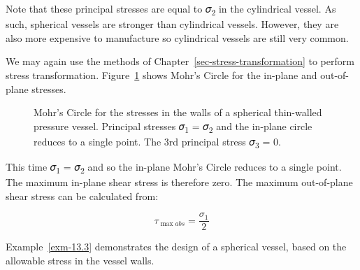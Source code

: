\documentclass[
  letterpaper,
  DIV=11,
  numbers=noendperiod]{scrreprt}
\theoremstyle{definition}
\theoremstyle{remark}
\begin{document}
Note that these principal stresses are equal to 𝜎\textsubscript{2} in
the cylindrical vessel. As such, spherical vessels are stronger than
cylindrical vessels. However, they are also more expensive to
manufacture so cylindrical vessels are still very common.

We may again use the methods of Chapter~\ref{sec-stress-transformation}
to perform stress transformation. Figure~\ref{fig-13.9} shows Mohr's
Circle for the in-plane and out-of-plane stresses.

\begin{figure}


\caption{\label{fig-13.9}Mohr's Circle for the stresses in the walls of
a spherical thin-walled pressure vessel. Principal stresses
𝜎\textsubscript{1} = 𝜎\textsubscript{2} and the in-plane circle reduces
to a single point. The 3rd principal stress 𝜎\textsubscript{3} = 0.}

\end{figure}%

This time 𝜎\textsubscript{1} = 𝜎\textsubscript{2} and so the in-plane
Mohr's Circle reduces to a single point. The maximum in-plane shear
stress is therefore zero. The maximum out-of-plane shear stress can be
calculated from:

\[
\tau_{\max a b s}=\frac{\sigma_1}{2}
\]

Example~\ref{exm-13.3} demonstrates the design of a spherical vessel,
based on the allowable stress in the vessel walls.
\end{document}
